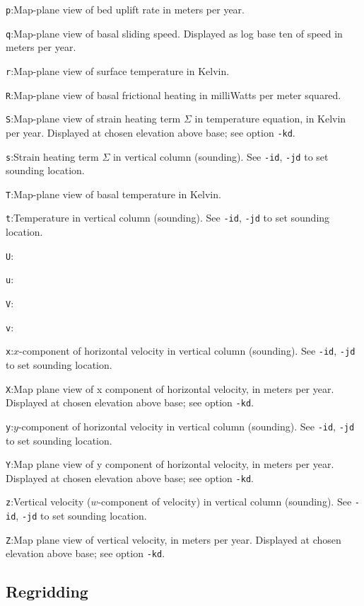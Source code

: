 \documentclass[11pt,final]{amsart}
\begin{document}
\verb|p|:\quad Map-plane view of bed uplift rate in meters per year.

\verb|q|:\quad Map-plane view of basal sliding speed.  Displayed as log base ten of speed in meters per year.

\verb|r|:\quad Map-plane view of surface temperature in Kelvin.

\verb|R|:\quad Map-plane view of basal frictional heating in milliWatts per meter squared.

\verb|S|:\quad Map-plane view of strain heating term $\Sigma$ in temperature equation, in Kelvin per year.  Displayed at chosen elevation above base; see option \verb|-kd|.

\verb|s|:\quad Strain heating term $\Sigma$ in vertical column (sounding).  See \verb|-id|, \verb|-jd| to set sounding location.

\verb|T|:\quad Map-plane view of basal temperature in Kelvin.

\verb|t|:\quad Temperature in vertical column (sounding).  See \verb|-id|, \verb|-jd| to set sounding location.

\verb|U|:\quad

\verb|u|:\quad

\verb|V|:\quad

\verb|v|:\quad

\verb|x|:\quad $x$-component of horizontal velocity in vertical column (sounding).  See \verb|-id|, \verb|-jd| to set sounding location.

\verb|X|:\quad Map plane view of x component of horizontal velocity, in meters per year.  Displayed at chosen elevation above base; see option \verb|-kd|.

\verb|y|:\quad $y$-component of horizontal velocity in vertical column (sounding).  See \verb|-id|, \verb|-jd| to set sounding location.

\verb|Y|:\quad Map plane view of y component of horizontal velocity, in meters per year.  Displayed at chosen elevation above base; see option \verb|-kd|.

\verb|z|:\quad Vertical velocity ($w$-component of velocity) in vertical column (sounding).  See \verb|-id|, \verb|-jd| to set sounding location.

\verb|Z|:\quad Map plane view of vertical velocity, in meters per year.  Displayed at chosen elevation above base; see option \verb|-kd|.


\subsection{Regridding}
\end{document}
